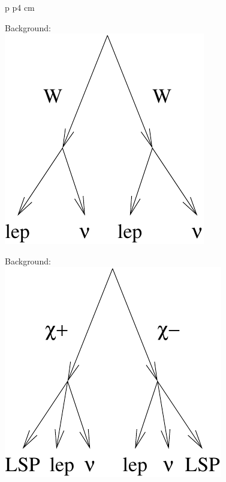 \documentclass[landscape]{article}
\begin{document}
\begin{center}
\begin{tabular}{p{\textheight} p{4 cm}}
\begin{minipage}{\linewidth}
      \vspace{1 cm}
      Background: \\
      \includegraphics[width=\linewidth]{two_leptons_background.pdf}

      \vspace{1 cm}
      Background: \\
      \includegraphics[width=\linewidth]{two_leptons_background2.pdf}
    \end{minipage}
  \end{tabular}
\end{center}
\pagebreak
\end{document}
